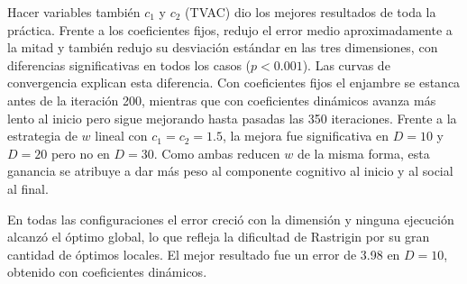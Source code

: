 Hacer variables también $c_1$ y $c_2$ (TVAC) dio los mejores resultados de toda la práctica. Frente a los coeficientes fijos, redujo el error medio aproximadamente a la mitad y también redujo su desviación estándar en las tres dimensiones, con diferencias significativas en todos los casos ($p < 0.001$). Las curvas de convergencia explican esta diferencia. Con coeficientes fijos el enjambre se estanca antes de la iteración 200, mientras que con coeficientes dinámicos avanza más lento al inicio pero sigue mejorando hasta pasadas las 350 iteraciones. Frente a la estrategia de $w$ lineal con $c_1 = c_2 = 1.5$, la mejora fue significativa en $D = 10$ y $D = 20$ pero no en $D = 30$. Como ambas reducen $w$ de la misma forma, esta ganancia se atribuye a dar más peso al componente cognitivo al inicio y al social al final.

En todas las configuraciones el error creció con la dimensión y ninguna ejecución alcanzó el óptimo global, lo que refleja la dificultad de Rastrigin por su gran cantidad de óptimos locales. El mejor resultado fue un error de 3.98 en $D = 10$, obtenido con coeficientes dinámicos.


%
%
